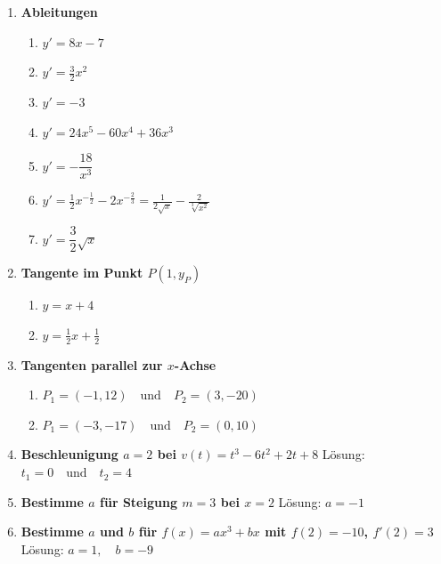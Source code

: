 \begin{enumerate}
	\item \textbf{Ableitungen}
	      \begin{enumerate}
		      \item \( y' = 8x - 7 \)
		      \item \( y' = \frac{3}{2}x^2 \)
		      \item \( y' = -3 \)
		      \item \( y' = 24x^5-60x^4+36x^3 \)
		      \item \( y' = -\dfrac{18}{x^3} \)
		      \item \( y' = \frac{1}{2} x^{-\frac{1}{2} } - 2x^{-\frac{2}{3}} = \frac{1}{2\sqrt{x}} - \frac{2}{\sqrt[3]{x^2}} \)
		      \item \( y' = \dfrac{3}{2} \sqrt{x} \)
	      \end{enumerate}

	\item \textbf{Tangente im Punkt \( P(1, y_P) \)}
	      \begin{enumerate}
		      \item \( y = x + 4 \)
		      \item \( y = \frac{1}{2} x + \frac{1}{2} \)
	      \end{enumerate}

	\item \textbf{Tangenten parallel zur \( x \)-Achse}
	      \begin{enumerate}
		      \item \( P_1 =( -1, 12) \quad \text{und} \quad P_2 = (3,-20) \)
		      \item \( P_1 = (-3,-17) \quad \text{und} \quad P_2= (0, 10) \)
	      \end{enumerate}

	\item \textbf{Beschleunigung \( a = 2 \) bei \( v(t) = t^3 - 6t^2 + 2t + 8 \)}
	      Lösung: \( t_1 = 0 \quad \text{und} \quad t_2 = 4 \)

	\item \textbf{Bestimme \( a \) für Steigung \( m = 3 \) bei \( x = 2 \)}
	      Lösung: \( a = -1 \)

	\item \textbf{Bestimme \( a \) und \( b \) für \( f(x) = ax^3 + bx \) mit \( f(2) = -10 \), \( f'(2) = 3 \)}
	      Lösung: \( a = 1, \quad b = -9 \)
\end{enumerate}











